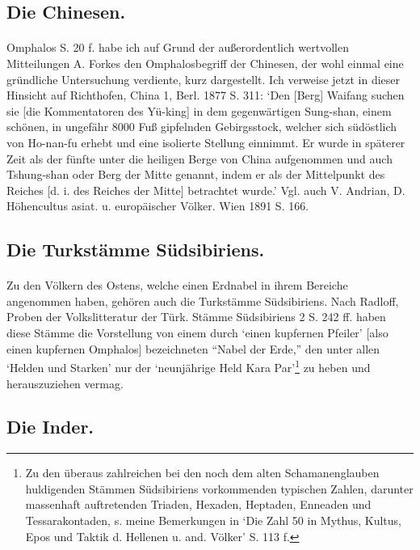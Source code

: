 \documentclass[a4paper, 11pt, oneside]{article}
\begin{document}
\subsection{Die Chinesen.}
\paragraph{}
Omphalos S. 20 f. habe ich auf Grund der außerordentlich wertvollen Mitteilungen A. Forkes den Omphalosbegriff der Chinesen, der wohl einmal eine gründliche Untersuchung verdiente, kurz dargestellt. Ich verweise jetzt in dieser Hinsicht auf Richthofen, China 1, Berl. 1877 S. 311: `Den [Berg] Waifang suchen sie [die Kommentatoren des Yü-king] in dem gegenwärtigen Sung-shan, einem schönen, in ungefähr 8000 Fuß gipfelnden Gebirgsstock, welcher sich südöstlich von Ho-nan-fu erhebt und eine isolierte Stellung einnimmt. Er wurde in späterer Zeit als der fünfte unter die heiligen Berge von China aufgenommen und auch Tshung-shan oder Berg der Mitte genannt, indem er als der Mittelpunkt des Reiches [d. i. des Reiches der Mitte] betrachtet wurde.' Vgl. auch V. Andrian, D. Höhencultus asiat. u. europäischer Völker. Wien 1891 S. 166.

\subsection{Die Turkstämme Südsibiriens.}
\paragraph{}
Zu den Völkern des Ostens, welche einen Erdnabel in ihrem Bereiche angenommen haben, gehören auch die Turkstämme Südsibiriens. Nach Radloff, Proben der Volkslitteratur der Türk. Stämme Südsibiriens 2 S. 242 ff. haben diese Stämme die Vorstellung von einem durch `einen kupfernen Pfeiler' [also einen kupfernen Omphalos] bezeichneten "`Nabel der Erde,"' den unter allen `Helden und Starken' nur der `neunjährige Held Kara Par'\footnote{Zu den überaus zahlreichen bei den noch dem alten Schamanenglauben huldigenden Stämmen Südsibiriens vorkommenden typischen Zahlen, darunter massenhaft auftretenden Triaden, Hexaden, Heptaden, Enneaden und Tessarakontaden, s. meine Bemerkungen in `Die Zahl 50 in Mythus, Kultus, Epos und Taktik d. Hellenen u. and. Völker' S. 113 f.} zu heben und herauszuziehen vermag.

\subsection{Die Inder.}
\end{document}
